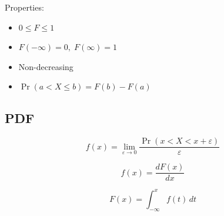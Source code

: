 \documentclass[12pt]{article}
\begin{document}
Properties:

\begin{itemize}
\item $0\le F\le 1$
\item $F(-\infty)=0,\;F(\infty)=1$
\item Non-decreasing
\item $\Pr(a<X\le b)=F(b)-F(a)$
\end{itemize}

\subsection*{PDF}

\[
f(x)=\lim_{\varepsilon\to 0}
\frac{\Pr(x<X<x+\varepsilon)}{\varepsilon}
\]

\[
f(x)=\frac{dF(x)}{dx}
\]

\[
F(x)=\int_{-\infty}^{x} f(t)\,dt
\]
\end{document}

